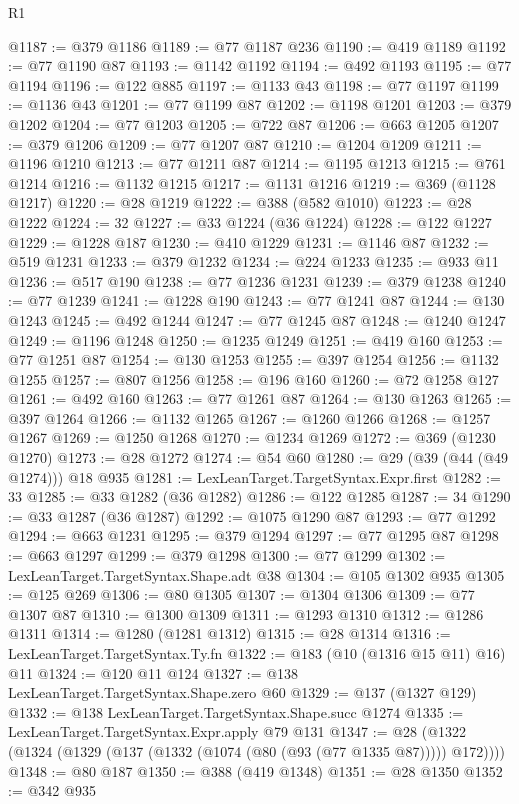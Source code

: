 \begin{lexlean}{R1}
\begin{coremodule}
@1187 := @379 @1186
@1189 := @77 @1187 @236
@1190 := @419 @1189
@1192 := @77 @1190 @87
@1193 := @1142 @1192
@1194 := @492 @1193
@1195 := @77 @1194
@1196 := @122 @885
@1197 := @1133 @43
@1198 := @77 @1197
@1199 := @1136 @43
@1201 := @77 @1199 @87
@1202 := @1198 @1201
@1203 := @379 @1202
@1204 := @77 @1203
@1205 := @722 @87
@1206 := @663 @1205
@1207 := @379 @1206
@1209 := @77 @1207 @87
@1210 := @1204 @1209
@1211 := @1196 @1210
@1213 := @77 @1211 @87
@1214 := @1195 @1213
@1215 := @761 @1214
@1216 := @1132 @1215
@1217 := @1131 @1216
@1219 := @369 (@1128 @1217)
@1220 := @28 @1219
@1222 := @388 (@582 @1010)
@1223 := @28 @1222
@1224 := 32
@1227 := @33 @1224 (@36 @1224)
@1228 := @122 @1227
@1229 := @1228 @187
@1230 := @410 @1229
@1231 := @1146 @87
@1232 := @519 @1231
@1233 := @379 @1232
@1234 := @224 @1233
@1235 := @933 @11
@1236 := @517 @190
@1238 := @77 @1236 @1231
@1239 := @379 @1238
@1240 := @77 @1239
@1241 := @1228 @190
@1243 := @77 @1241 @87
@1244 := @130 @1243
@1245 := @492 @1244
@1247 := @77 @1245 @87
@1248 := @1240 @1247
@1249 := @1196 @1248
@1250 := @1235 @1249
@1251 := @419 @160
@1253 := @77 @1251 @87
@1254 := @130 @1253
@1255 := @397 @1254
@1256 := @1132 @1255
@1257 := @807 @1256
@1258 := @196 @160
@1260 := @72 @1258 @127
@1261 := @492 @160
@1263 := @77 @1261 @87
@1264 := @130 @1263
@1265 := @397 @1264
@1266 := @1132 @1265
@1267 := @1260 @1266
@1268 := @1257 @1267
@1269 := @1250 @1268
@1270 := @1234 @1269
@1272 := @369 (@1230 @1270)
@1273 := @28 @1272
@1274 := @54 @60
@1280 := @29 (@39 (@44 (@49 @1274))) @18 @935
@1281 := LexLeanTarget.TargetSyntax.Expr.first
@1282 := 33
@1285 := @33 @1282 (@36 @1282)
@1286 := @122 @1285
@1287 := 34
@1290 := @33 @1287 (@36 @1287)
@1292 := @1075 @1290 @87
@1293 := @77 @1292
@1294 := @663 @1231
@1295 := @379 @1294
@1297 := @77 @1295 @87
@1298 := @663 @1297
@1299 := @379 @1298
@1300 := @77 @1299
@1302 := LexLeanTarget.TargetSyntax.Shape.adt @38
@1304 := @105 @1302 @935
@1305 := @125 @269
@1306 := @80 @1305
@1307 := @1304 @1306
@1309 := @77 @1307 @87
@1310 := @1300 @1309
@1311 := @1293 @1310
@1312 := @1286 @1311
@1314 := @1280 (@1281 @1312)
@1315 := @28 @1314
@1316 := LexLeanTarget.TargetSyntax.Ty.fn
@1322 := @183 (@10 (@1316 @15 @11) @16) @11
@1324 := @120 @11 @124
@1327 := @138 LexLeanTarget.TargetSyntax.Shape.zero @60
@1329 := @137 (@1327 @129)
@1332 := @138 LexLeanTarget.TargetSyntax.Shape.succ @1274
@1335 := LexLeanTarget.TargetSyntax.Expr.apply @79 @131
@1347 := @28 (@1322 (@1324 (@1329 (@137 (@1332 (@1074 (@80 (@93 (@77 @1335 @87))))) @172))))
@1348 := @80 @187
@1350 := @388 (@419 @1348)
@1351 := @28 @1350
@1352 := @342 @935

\end{coremodule}
\end{lexlean}
